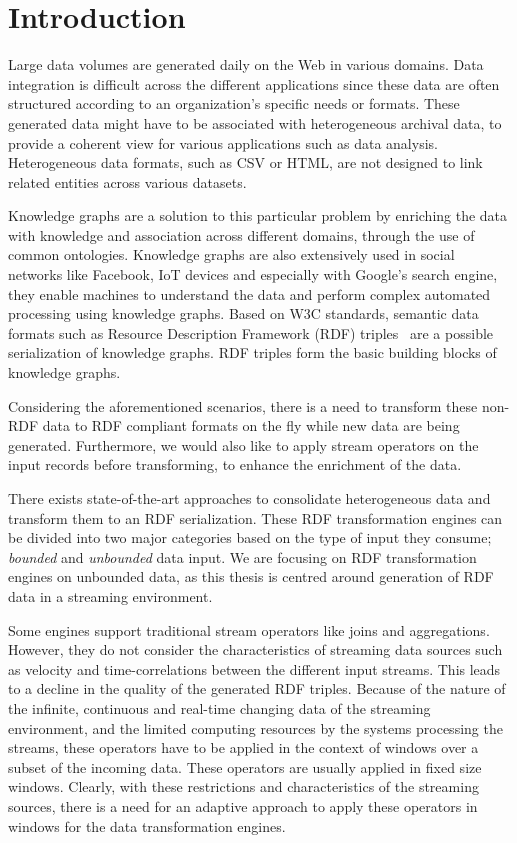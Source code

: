 \chapter{Introduction}
\label{chap:intro}

Large data volumes are generated daily on the Web in various domains.
Data integration is difficult across the different applications since these
data are often structured according to an organization's specific needs or formats. 
These generated data might have to be associated with heterogeneous archival data,  
to provide a coherent view for various applications such as 
data analysis. Heterogeneous data formats, such as CSV or HTML, are not
designed to link related entities across various datasets. 

Knowledge graphs are a solution to
this particular problem by enriching the data with knowledge and association across
different domains, through the use of common ontologies.
Knowledge graphs are also extensively used in social networks like 
Facebook\cite{facebook_linked_data}, IoT devices\cite{graph_of_things} and especially with Google's search
engine\cite{google_kg}, they enable machines to understand the data and perform complex automated processing
using knowledge graphs. 
Based on W3C standards, semantic data formats such as Resource Description Framework (RDF)
triples~\cite{intro_rdf} are a possible serialization of knowledge graphs.  
RDF triples form the basic building blocks of knowledge graphs.

Considering the aforementioned scenarios, there is a need to transform these non-RDF data to RDF compliant formats on the fly while
new data are being generated. Furthermore, we would also like to apply stream operators on the input records
before transforming, to enhance the enrichment of the data.

There exists state-of-the-art approaches to consolidate heterogeneous data
and transform them to an RDF serialization. 
These RDF transformation engines can be divided into two major categories based on the type of input
they consume; \emph{bounded} and \emph{unbounded} data input. We are focusing on RDF transformation 
engines on unbounded data, as this thesis is centred around generation of RDF data in a streaming environment.  

Some engines support traditional stream operators like joins and aggregations. However, they do not consider
the characteristics of streaming data sources such as velocity and time-correlations between the different
input streams. This leads to a decline in the quality of the generated RDF triples. Because of the nature of the 
infinite, continuous and real-time changing data of the streaming environment, and 
the limited computing resources by the systems processing the streams, 
these operators have to be applied in the context of windows over a subset of the incoming data.
These operators are usually applied in fixed size windows.
Clearly, with these restrictions and characteristics of the streaming sources, there is a need 
for an adaptive approach to apply these operators in windows for the data transformation engines. 

